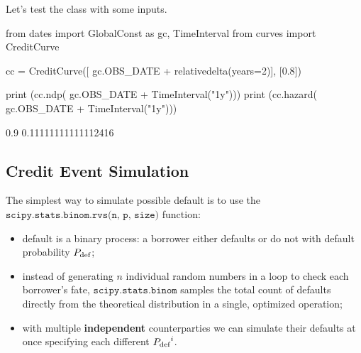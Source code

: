 Let's test the class with some inputs.
\begin{ipythonnon}
from dates import GlobalConst as gc, TimeInterval
from curves import CreditCurve

cc = CreditCurve([ gc.OBS_DATE + relativedelta(years=2)], [0.8])

print (cc.ndp( gc.OBS_DATE + TimeInterval("1y")))
print (cc.hazard( gc.OBS_DATE + TimeInterval("1y")))
\end{ipythonnon}
\begin{ioutput}
0.9
0.11111111111112416
\end{ioutput}

\subsection{Credit Event Simulation}
\label{sec:credit_event_simulation}
The simplest way to simulate possible default is to use the $\texttt{scipy.stats.binom.rvs(n, p, size)}$ function:
\begin{itemize}
	\item default is a binary process: a borrower either defaults or do not with default probability $P_{\text{def}}$;
	\item instead of generating $n$ individual random numbers in a loop to check each borrower's fate, $\texttt{scipy.stats.binom}$ samples the total count of defaults directly from the theoretical distribution in a single, optimized operation;
	\item with multiple \textbf{independent} counterparties we can simulate their defaults at once specifying each different ${P_{\text{def}}}^i$.
\end{itemize}	


